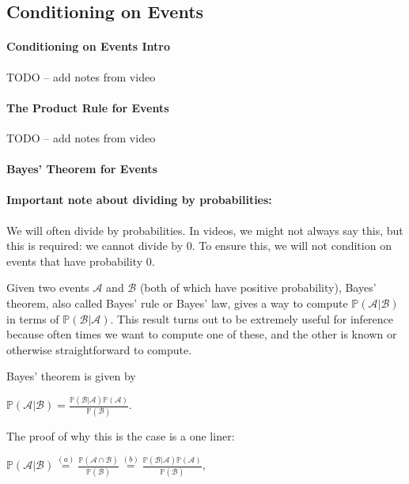 \documentclass[6008notes.tex]{subfiles}
\begin{document}
\graphicspath{ {images/conditioning/} }

\subsection{Conditioning on Events}

\paragraph{Conditioning on Events Intro}

TODO -- add notes from video

\paragraph{The Product Rule for Events}

TODO -- add notes from video

\paragraph{Bayes' Theorem for Events}

\paragraph{Important note about dividing by probabilities:} We will often divide by probabilities. In videos, we might not always say this, but this is required: we cannot divide by 0. To ensure this, we will not condition on events that have probability 0.

Given two events $\mathcal{A}$ and $\mathcal{B}$ (both of which have positive probability), Bayes' theorem, also called Bayes' rule or Bayes' law, gives a way to compute $\mathbb {P}(\mathcal{A} | \mathcal{B})$ in terms of $\mathbb {P}(\mathcal{B} | \mathcal{A})$. This result turns out to be extremely useful for inference because often times we want to compute one of these, and the other is known or otherwise straightforward to compute.

Bayes' theorem is given by

$\mathbb {P}(\mathcal{A} | \mathcal{B}) = \frac{\mathbb {P}(\mathcal{B} | \mathcal{A}) \mathbb {P}(\mathcal{A})}{\mathbb {P}(\mathcal{B})}.$
 
The proof of why this is the case is a one liner:

$\mathbb {P}(\mathcal{A} | \mathcal{B}) \overset {(a)}{=} \frac{\mathbb {P}(\mathcal{A} \cap \mathcal{B})}{\mathbb {P}(\mathcal{B})} \overset {(b)}{=} \frac{\mathbb {P}(\mathcal{B} | \mathcal{A}) \mathbb {P}(\mathcal{A})}{\mathbb {P}(\mathcal{B})},$
 
\end{document}
